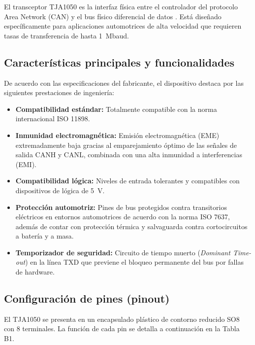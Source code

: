 El transceptor TJA1050 es la interfaz física entre el controlador del protocolo Area Network (CAN) y el bus físico diferencial de datos \citep{tja1050_datasheet}. Está diseñado específicamente para aplicaciones automotrices de alta velocidad que requieren tasas de transferencia de hasta 1~Mbaud.

\subsection*{Características principales y funcionalidades}
De acuerdo con las especificaciones del fabricante, el dispositivo destaca por las siguientes prestaciones de ingeniería:
\begin{itemize}
	\item \textbf{Compatibilidad estándar:} Totalmente compatible con la norma internacional ISO 11898.
	\item \textbf{Inmunidad electromagnética:} Emisión electromagnética (EME) extremadamente baja gracias al emparejamiento óptimo de las señales de salida CANH y CANL, combinada con una alta inmunidad a interferencias (EMI).
	\item \textbf{Compatibilidad lógica:} Niveles de entrada tolerantes y compatibles con dispositivos de lógica de 5~V.
	\item \textbf{Protección automotriz:} Pines de bus protegidos contra transitorios eléctricos en entornos automotrices de acuerdo con la norma ISO 7637, además de contar con protección térmica y salvaguarda contra cortocircuitos a batería y a masa.
	\item \textbf{Temporizador de seguridad:} Circuito de tiempo muerto (\textit{Dominant Time-out}) en la línea TXD que previene el bloqueo permanente del bus por fallas de hardware.
\end{itemize}

\subsection*{Configuración de pines (pinout)}
El TJA1050 se presenta en un encapsulado plástico de contorno reducido SO8 con 8 terminales. La función de cada pin se detalla a continuación en la Tabla B1.

\vspace{2mm}

\small
\renewcommand{\arraystretch}{1.3}
\tablelasttail{\bottomrule}

